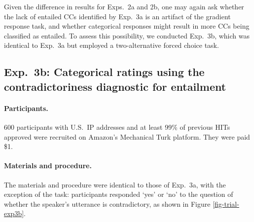 \documentclass{language}
\newcommand{\6}{\mbox{$[\hspace*{-.6mm}[$}}
\newcommand{\9}{\mbox{$]\hspace*{-.6mm}]$}}
\begin{document}
Given the difference in results for Exps.~2a and 2b, one may again ask whether the lack of entailed CCs identified by Exp.~3a is an artifact of the gradient response task, and whether categorical responses might result in more CCs being classified as entailed. To assess this possibility, we conducted Exp.~3b, which was identical to Exp.~3a but employed a two-alternative forced choice task.



\subsection{Exp.~3b: Categorical ratings using the contradictoriness diagnostic for entailment}\label{s32}


\paragraph{Participants.} 600 participants with U.S.\ IP addresses and at least 99\% of previous HITs approved were recruited on Amazon's Mechanical Turk platform. They were paid \$1.

\paragraph{Materials and procedure.} The materials and procedure were identical to those of Exp.~3a, with the exception of the task: participants responded `yes' or `no' to the question of whether the speaker's utterance is contradictory, as shown in Figure \ref{fig-trial-exp3b}.
\end{document}

